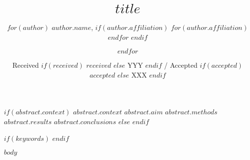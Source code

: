 \documentclass{aa}
\begin{document}
\title{$title$}

\author{
$for(author)$
$author.name$,
$if(author.affiliation)$
$for(author.affiliation)$
$endfor$
$endif$
\and
$endfor$
}


\date{
Received
$if(received)$
$received$
$else$
YYY
$endif$
/ 
Accepted 
$if(accepted)$
$accepted$
$else$
XXX
$endif$
}

$if(abstract.context)$
\abstract
{$abstract.context$}
{$abstract.aim$}
{$abstract.methods$}
{$abstract.results$}
{$abstract.conclusions$}
$else$
$endif$

$if(keywords)$
$endif$

\maketitle

$body$
\end{document}
